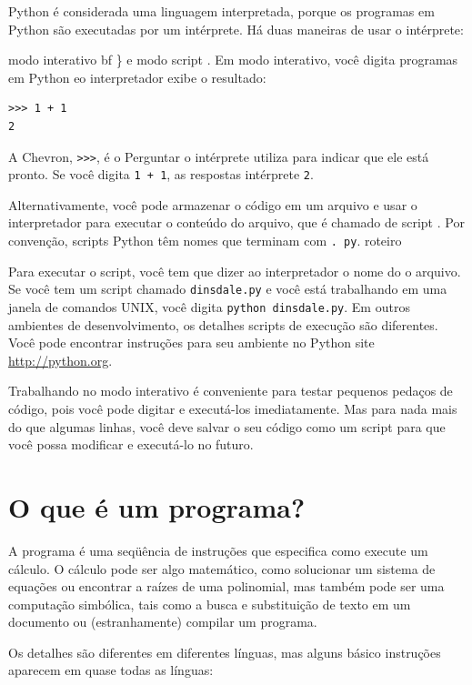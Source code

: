 \documentclass[10pt]{book}
\begin{document}
Python é considerada uma linguagem interpretada, porque os programas em Python
são executadas por um intérprete. Há duas maneiras de usar o
intérprete: {modo interativo bf \} e {modo script \bf}. Em
modo interativo, você digita programas em Python eo interpretador exibe
o resultado:

\begin{verbatim}
>>> 1 + 1
2
\end{verbatim}
%
A Chevron, \verb ">>>", é o
{Perguntar \bf} o intérprete utiliza para indicar que ele está pronto. Se
você digita {\tt 1 + 1}, as respostas intérprete {\tt 2}.

Alternativamente, você pode armazenar o código em um arquivo e usar o interpretador para
executar o conteúdo do arquivo, que é chamado de {script \bf}. Por
convenção, scripts Python têm nomes que terminam com {\tt. py}.
\index{} roteiro

Para executar o script, você tem que dizer ao interpretador o nome do
o arquivo. Se você tem um script chamado {\tt dinsdale.py} e você está
trabalhando em uma janela de comandos UNIX, você digita {\tt python
dinsdale.py}. Em outros ambientes de desenvolvimento, os detalhes
scripts de execução são diferentes. Você pode encontrar instruções para
seu ambiente no Python site \url{http://python.org}.

Trabalhando no modo interativo é conveniente para testar pequenos pedaços de
código, pois você pode digitar e executá-los imediatamente. Mas para
nada mais do que algumas linhas, você deve salvar o seu código
como um script para que você possa modificar e executá-lo no futuro.


\section{O que é um programa?}

A {programa \bf} é uma seqüência de instruções que especifica como
execute um cálculo. O cálculo pode ser algo
matemático, como solucionar um sistema de equações ou encontrar a
raízes de uma polinomial, mas também pode ser uma computação simbólica, tais
como a busca e substituição de texto em um documento ou (estranhamente)
compilar um programa.

Os detalhes são diferentes em diferentes línguas, mas alguns básico
instruções aparecem em quase todas as línguas:

\begin{description}


\end{description}}
\end{document}
